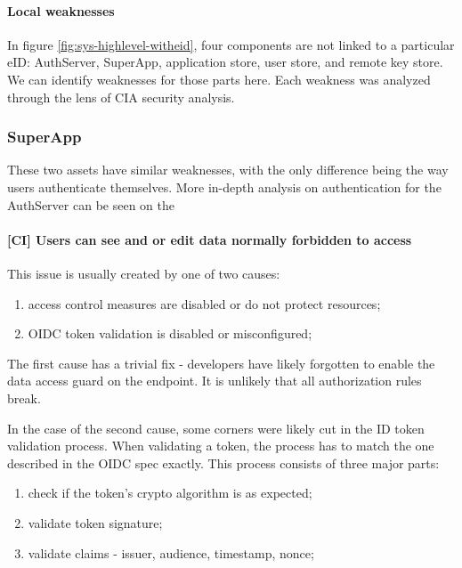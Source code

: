 \paragraph{Local weaknesses}

In figure \ref{fig:sys-highlevel-witheid}, four components are not linked to a particular eID: AuthServer, SuperApp, application store, user store, and remote key store. We can identify weaknesses for those parts here. Each weakness was analyzed through the lens of CIA security analysis.


\subsubsection{SuperApp}

These two assets have similar weaknesses, with the only difference being the way users authenticate themselves. More in-depth analysis on authentication for the AuthServer can be seen on the 

\paragraph{[CI] Users can see and or edit data normally forbidden to access} This issue is usually created by one of two causes:

\begin{enumerate}
  \item access control measures are disabled or do not protect resources;
  \item OIDC token validation is disabled or misconfigured;
\end{enumerate}

The first cause has a trivial fix - developers have likely forgotten to enable the data access guard on the endpoint. It is unlikely that all authorization rules break.

In the case of the second cause, some corners were likely cut in the ID token validation process. When validating a token, the process has to match the one described in the OIDC spec \cite{oidc} exactly. This process consists of three major parts:

\begin{enumerate}
  \item check if the token's crypto algorithm is as expected;
  \item validate token signature;
  \item validate claims - issuer, audience, timestamp, nonce;
\end{enumerate}

